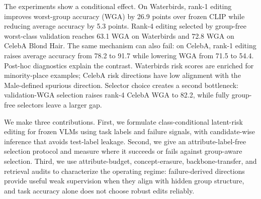 The experiments show a conditional effect. On Waterbirds, rank-1 editing improves worst-group accuracy (WGA) by 26.9 points over frozen CLIP while reducing average accuracy by 5.3 points. Rank-4 editing selected by group-free worst-class validation reaches 63.1 WGA on Waterbirds and 72.8 WGA on CelebA Blond Hair. The same mechanism can also fail: on CelebA, rank-1 editing raises average accuracy from 78.2 to 91.7 while lowering WGA from 71.5 to 54.4. Post-hoc diagnostics explain the contrast. Waterbirds risk scores are enriched for minority-place examples; CelebA risk directions have low alignment with the Male-defined spurious direction. Selector choice creates a second bottleneck: validation-WGA selection raises rank-4 CelebA WGA to 82.2, while fully group-free selectors leave a larger gap.

We make three contributions. First, we formulate class-conditional latent-risk editing for frozen VLMs using task labels and failure signals, with candidate-wise inference that avoids test-label leakage. Second, we give an attribute-label-free selection protocol and measure where it succeeds or fails against group-aware selection. Third, we use attribute-budget, concept-erasure, backbone-transfer, and retrieval audits to characterize the operating regime: failure-derived directions provide useful weak supervision when they align with hidden group structure, and task accuracy alone does not choose robust edits reliably.
